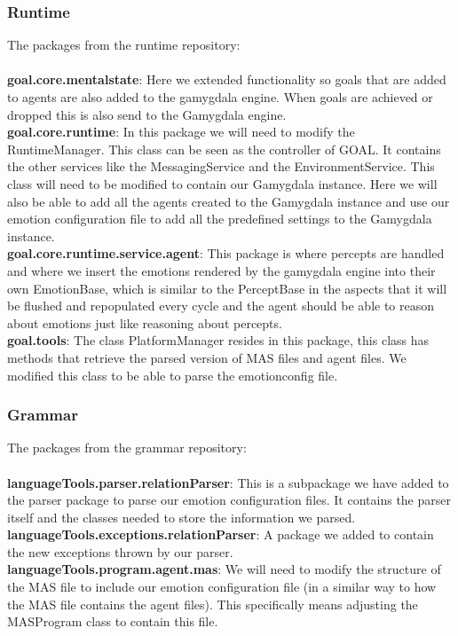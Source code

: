 \documentclass[]{article}
\begin{document}
\subsubsection{Runtime}
The packages from the runtime repository: \\ \\
\textbf{goal.core.mentalstate}: Here we extended functionality so goals that are added to agents are also added to the gamygdala engine. When goals are achieved or dropped this is also send to the Gamygdala engine. \\
\textbf{goal.core.runtime}: In this package we will need to modify the RuntimeManager. This class can be seen as the controller of GOAL. It contains the other services like the MessagingService and the EnvironmentService. This class will need to be modified to contain our Gamygdala instance. Here we will also be able to add all the agents created to the Gamygdala instance and use our emotion configuration file to add all the predefined settings to the Gamygdala instance. \\
\textbf{goal.core.runtime.service.agent}: This package is where percepts are handled and where we insert the emotions rendered by the gamygdala engine into their own EmotionBase, which is similar to the PerceptBase in the aspects that it will be flushed and repopulated every cycle and the agent should be able to reason about emotions just like reasoning about percepts. \\
\textbf{goal.tools}: The class PlatformManager resides in this package, this class has methods that retrieve the parsed version of MAS files and agent files. We modified this class to be able to parse the emotionconfig file.

\subsubsection{Grammar}
The packages from the grammar repository: \\ \\
\textbf{languageTools.parser.relationParser}: This is a subpackage we have added to the parser package to parse our emotion configuration files. It contains the parser itself and the classes needed to store the information we parsed.\\
\textbf{languageTools.exceptions.relationParser}: A package we added to contain the new exceptions thrown by our parser. \\
\textbf{languageTools.program.agent.mas}: We will need to modify the structure of the MAS file to include our emotion configuration file (in a similar way to how the MAS file contains the agent files). This specifically means adjusting the MASProgram class to contain this file. \\
\newpage
\end{document}
